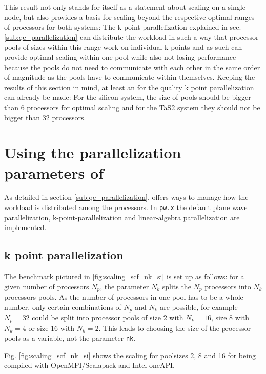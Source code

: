 \documentclass[main.tex]{subfiles}
\begin{document}

This result not only stands for itself as a statement about scaling on a single node, but also provides a basis for scaling beyond the respective optimal ranges of processors for both systems:
The k point parallelization explained in sec. \ref{sub:qe_parallelization} can distribute the workload in such a way that processor pools of sizes within this range work on individual k points and as such can provide optimal scaling within one pool while also not losing performance because the pools do not need to communicate with each other in the same order of magnitude as the pools have to communicate within themselves.
Keeping the results of this section in mind, at least an for the quality k point parallelization can already be made:
For the silicon system, the size of pools should be bigger than 6 processors for optimal scaling and for the TaS2 system they should not be bigger than 32 processors.

\section{Using the parallelization parameters of \QE}

As detailed in section \ref{sub:qe_parallelization}, \QE offers ways to manage how the workload is distributed among the processors.
In \texttt{pw.x} the default plane wave parallelization, k-point-parallelization and linear-algebra parallelization are implemented.

\subsection{k point parallelization}

The benchmark pictured in \ref{fig:scaling_scf_nk_si} is set up as follows: for a given number of processors \(N_p\), the parameter \(N_k\) splits the \(N_p\) processors into \(N_k\) processors pools.
As the number of processors in one pool has to be a whole number, only certain combinations of \(N_p\) and \(N_k\) are possible, for example \(N_p = 32\) could be split into processor pools of size 2 with \(N_k = 16\), size 8 with \(N_k = 4\) or size 16 with \(N_k = 2\).
This leads to choosing the size of the processor pools as a variable, not the parameter \texttt{nk}.

Fig. \ref{fig:scaling_scf_nk_si} shows the scaling for poolsizes 2, 8 and 16 for \QE being compiled with OpenMPI/Scalapack and Intel oneAPI.
\end{document}
